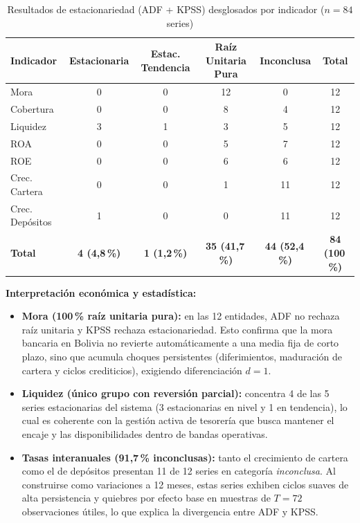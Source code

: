 \documentclass[11pt,letterpaper]{article}
\begin{document}
\begin{table}[H]
\centering
\caption{Resultados de estacionariedad (ADF + KPSS) desglosados por indicador (\(n=84\) series)}
\label{tab:estac_indicador}
\small
\begin{tabular}{lccccc}
\toprule
Indicador & Estacionaria & Estac. Tendencia & Raíz Unitaria Pura & Inconclusa & Total \\
\midrule
Mora & 0 & 0 & 12 & 0 & 12 \\
Cobertura & 0 & 0 & 8 & 4 & 12 \\
Liquidez & 3 & 1 & 3 & 5 & 12 \\
ROA & 0 & 0 & 5 & 7 & 12 \\
ROE & 0 & 0 & 6 & 6 & 12 \\
Crec. Cartera & 0 & 0 & 1 & 11 & 12 \\
Crec. Depósitos & 1 & 0 & 0 & 11 & 12 \\
\midrule
\textbf{Total} & \textbf{4 (4{,}8\,\%)} & \textbf{1 (1{,}2\,\%)} & \textbf{35 (41{,}7\,\%)} & \textbf{44 (52{,}4\,\%)} & \textbf{84 (100\,\%)} \\
\bottomrule
\end{tabular}
\end{table}

\textbf{Interpretación económica y estadística:}
\begin{itemize}[leftmargin=1.5em]
  \item \textbf{Mora (100\,\% raíz unitaria pura):} en las 12 entidades, ADF no rechaza raíz unitaria y KPSS rechaza estacionariedad. Esto confirma que la mora bancaria en Bolivia no revierte automáticamente a una media fija de corto plazo, sino que acumula choques persistentes (diferimientos, maduración de cartera y ciclos crediticios), exigiendo diferenciación \(d = 1\).
  \item \textbf{Liquidez (único grupo con reversión parcial):} concentra 4 de las 5 series estacionarias del sistema (3 estacionarias en nivel y 1 en tendencia), lo cual es coherente con la gestión activa de tesorería que busca mantener el encaje y las disponibilidades dentro de bandas operativas.
  \item \textbf{Tasas interanuales (91{,}7\,\% inconclusas):} tanto el crecimiento de cartera como el de depósitos presentan 11 de 12 series en categoría \emph{inconclusa}. Al construirse como variaciones a 12 meses, estas series exhiben ciclos suaves de alta persistencia y quiebres por efecto base en muestras de \(T=72\) observaciones útiles, lo que explica la divergencia entre ADF y KPSS.
\end{itemize}
\end{document}
